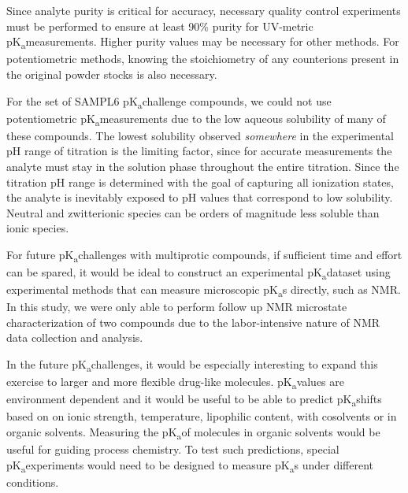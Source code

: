 \documentclass[9pt,lineno]{elife}
\newcommand{\pKa}{pK\textsubscript{a}}
\begin{document}
Since analyte purity is critical for accuracy, necessary quality control experiments must be performed to ensure at least 90\% purity for UV-metric \pKa measurements. Higher purity values may be necessary for other methods. 
For potentiometric methods, knowing the stoichiometry of any counterions present in the original powder stocks is also necessary.

For the set of SAMPL6 \pKa challenge compounds, we could not use potentiometric \pKa measurements due to the low aqueous solubility of many of these compounds. The lowest solubility observed \emph{somewhere} in the experimental pH range of titration is the limiting factor, since for accurate measurements the analyte must stay in the solution phase throughout the entire titration. 
Since the titration pH range is determined with the goal of capturing all ionization states, the analyte is inevitably exposed to pH values that correspond to low solubility. 
Neutral and zwitterionic species can be orders of magnitude less soluble than ionic species. 

For future \pKa challenges with multiprotic compounds, if sufficient time and effort can be spared, it would be ideal to construct an experimental \pKa dataset using experimental methods that can measure microscopic \pKa s directly, such as NMR. 
In this study, we were only able to perform follow up NMR microstate characterization of two compounds due to the labor-intensive nature of NMR data collection and analysis. 

In the future \pKa challenges, it would be especially interesting to expand this exercise to larger and more flexible drug-like molecules. 
\pKa values are environment dependent and it would be useful to be able to predict \pKa shifts based on on ionic strength, temperature, lipophilic content, with cosolvents or in organic solvents. 
Measuring the \pKa of molecules in organic solvents would be useful for guiding process chemistry. 
To test such predictions, special \pKa experiments would need to be designed to measure \pKa s under different conditions.

\end{document}
